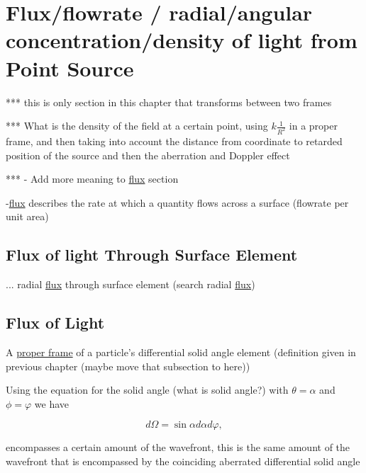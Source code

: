 \section{Flux/flowrate  /  radial/angular concentration/density of light from Point Source} \label{sect: Flux from Point Source}

*** this is only section in this chapter that transforms between two frames

*** What is the density of the field at a certain point, using $k \frac{1}{R^2}$ in a proper frame, and then taking into account the distance from coordinate to retarded position of the source and then the aberration and Doppler effect

*** - Add more meaning to \hyperlink{def-flux}{flux} section

-\hyperlink{def-flux}{flux} describes the rate at which a quantity flows across a surface (flowrate per unit area)

\subsection{Flux of light Through Surface Element}\label{subsect: Flux Through Surface Element}

... radial \hyperlink{def-flux}{flux} through surface element (search radial \hyperlink{def-flux}{flux})

\subsection{Flux of Light} \label{subsect: Field Flux}

A \hyperlink{def-proper-frame}{proper frame} of a particle's differential solid angle element (definition given in previous chapter (maybe move that subsection to here))

Using the equation for the solid angle (what is solid angle?) with $\theta = \alpha$ and $\phi= \varphi$ we have

\begin{equation}
	d\Omega = \sin{\alpha} d\alpha d\varphi,
\end{equation}

encompasses a certain amount of the wavefront, this is the same amount of the wavefront that is encompassed by the coinciding aberrated differential solid angle

